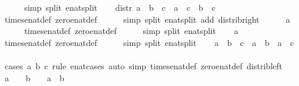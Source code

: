 \begin{isabellebody}
\ \ \ \ \isamarkupfalse%
\ {\isacharparenleft}simp\ split{\isacharcolon}\ enat{\isachardot}split{\isacharparenright}\isanewline
\ \ \isamarkupfalse%
\ distr{\isacharcolon}\ {\isachardoublequoteopen}{\isacharparenleft}a\ {\isacharplus}\ b{\isacharparenright}\ {\isacharasterisk}\ c\ {\isacharequal}\ a\ {\isacharasterisk}\ c\ {\isacharplus}\ b\ {\isacharasterisk}\ c{\isachardoublequoteclose}\isanewline
\ \ \ \ \isamarkupfalse%
\ times{\isacharunderscore}enat{\isacharunderscore}def\ zero{\isacharunderscore}enat{\isacharunderscore}def\isanewline
\ \ \ \ \isamarkupfalse%
\ {\isacharparenleft}simp\ split{\isacharcolon}\ enat{\isachardot}split\ add{\isacharcolon}\ distrib{\isacharunderscore}right{\isacharparenright}\isanewline
\ \ \isamarkupfalse%
\ {\isachardoublequoteopen}{}\ {\isacharasterisk}\ a\ {\isacharequal}\ {}{\isachardoublequoteclose}\isanewline
\ \ \ \ \isamarkupfalse%
\ times{\isacharunderscore}enat{\isacharunderscore}def\ zero{\isacharunderscore}enat{\isacharunderscore}def\isanewline
\ \ \ \ \isamarkupfalse%
\ {\isacharparenleft}simp\ split{\isacharcolon}\ enat{\isachardot}split{\isacharparenright}\isanewline
\ \ \isamarkupfalse%
\ {\isachardoublequoteopen}a\ {\isacharasterisk}\ {}\ {\isacharequal}\ {}{\isachardoublequoteclose}\isanewline
\ \ \ \ \isamarkupfalse%
\ times{\isacharunderscore}enat{\isacharunderscore}def\ zero{\isacharunderscore}enat{\isacharunderscore}def\isanewline
\ \ \ \ \isamarkupfalse%
\ {\isacharparenleft}simp\ split{\isacharcolon}\ enat{\isachardot}split{\isacharparenright}\isanewline
\ \ \isamarkupfalse%
\ {\isachardoublequoteopen}a\ {\isacharasterisk}\ {\isacharparenleft}b\ {\isacharplus}\ c{\isacharparenright}\ {\isacharequal}\ a\ {\isacharasterisk}\ b\ {\isacharplus}\ a\ {\isacharasterisk}\ c{\isachardoublequoteclose}\isanewline
\ \ \ \ \isamarkupfalse%
\ {\isacharparenleft}cases\ a\ b\ c\ rule{\isacharcolon}\ enat{}{\isacharunderscore}cases{\isacharparenright}\ {\isacharparenleft}auto\ simp{\isacharcolon}\ times{\isacharunderscore}enat{\isacharunderscore}def\ zero{\isacharunderscore}enat{\isacharunderscore}def\ distrib{\isacharunderscore}left{\isacharparenright}\isanewline
\ \ \isamarkupfalse%
\ {\isachardoublequoteopen}a\ {\isasymnoteq}\ {}\ {\isasymLongrightarrow}\ b\ {\isasymnoteq}\ {}\ {\isasymLongrightarrow}\ a\ {\isacharasterisk}\ b\ {\isasymnoteq}\ {}{\isachardoublequoteclose}\isanewline

\end{isabellebody}
